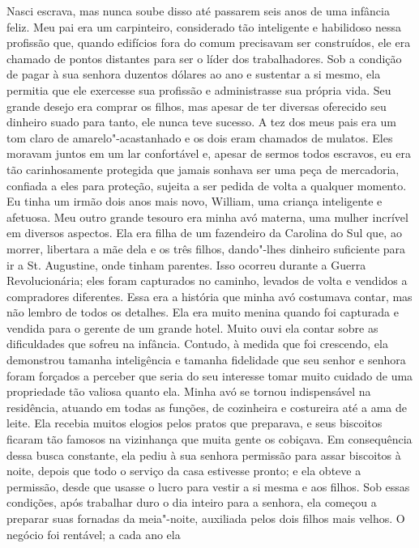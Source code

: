 Nasci escrava, mas nunca soube disso
até passarem seis anos de uma infância feliz. Meu pai era um
carpinteiro, considerado tão inteligente e habilidoso nessa profissão
que, quando edifícios fora do comum precisavam ser construídos, ele era
chamado de pontos distantes para ser o líder dos trabalhadores. Sob a
condição de pagar à sua senhora duzentos dólares ao ano e sustentar a si
mesmo, ela permitia que ele exercesse sua profissão e administrasse sua
própria vida. Seu grande desejo era comprar os filhos, mas apesar de ter
diversas oferecido seu dinheiro suado para tanto, ele nunca teve
sucesso. A tez dos meus pais era um tom claro de amarelo"-acastanhado e
os dois eram chamados de mulatos. Eles moravam juntos em um lar
confortável e, apesar de sermos todos escravos, eu era tão
carinhosamente protegida que jamais sonhava ser uma peça de mercadoria,
confiada a eles para proteção, sujeita a ser pedida de volta a qualquer
momento. Eu tinha um irmão dois anos mais novo, William, uma criança
inteligente e afetuosa. Meu outro grande tesouro era minha avó materna,
uma mulher incrível em diversos aspectos. Ela era filha de um fazendeiro
da Carolina do Sul que, ao morrer, libertara a mãe dela e os três
filhos, dando"-lhes dinheiro suficiente para ir a St. Augustine, onde
tinham parentes. Isso ocorreu durante a Guerra Revolucionária; eles
foram capturados no caminho, levados de volta e vendidos a compradores
diferentes. Essa era a história que minha avó costumava contar, mas não
lembro de todos os detalhes. Ela era muito menina quando foi capturada e
vendida para o gerente de um grande hotel. Muito ouvi ela contar sobre
as dificuldades que sofreu na infância. Contudo, à medida que foi
crescendo, ela demonstrou tamanha inteligência e tamanha fidelidade que
seu senhor e senhora foram forçados a perceber que seria do seu
interesse tomar muito cuidado de uma propriedade tão valiosa quanto ela.
Minha avó se tornou indispensável na residência, atuando em todas as
funções, de cozinheira e costureira até a ama de leite. Ela recebia
muitos elogios pelos pratos que preparava, e seus biscoitos ficaram tão
famosos na vizinhança que muita gente os cobiçava. Em consequência dessa
busca constante, ela pediu à sua senhora permissão para assar biscoitos
à noite, depois que todo o serviço da casa estivesse pronto; e ela
obteve a permissão, desde que usasse o lucro para vestir a si mesma e
aos filhos. Sob essas condições, após trabalhar duro o dia inteiro para
a senhora, ela começou a preparar suas fornadas da meia"-noite, auxiliada
pelos dois filhos mais velhos. O negócio foi rentável; a cada ano ela
